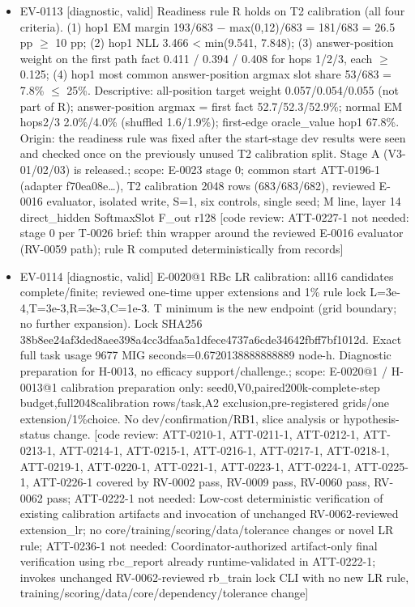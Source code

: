 \documentclass[11pt]{article}
\begin{document}
\begin{itemize}
\item EV-0113 [diagnostic, valid] Readiness rule R holds on T2 calibration (all four criteria). (1) hop1 EM margin 193/683 \ensuremath{-} max(0,12)/683 = 181/683 = 26.5 pp \ensuremath{\geq} 10 pp; (2) hop1 NLL 3.466 \textless{} min(9.541, 7.848); (3) answer-position weight on the first path fact 0.411 / 0.394 / 0.408 for hops 1/2/3, each \ensuremath{\geq} 0.125; (4) hop1 most common answer-position argmax slot share 53/683 = 7.8\% \ensuremath{\leq} 25\%. Descriptive: all-position target weight 0.057/0.054/0.055 (not part of R); answer-position argmax = first fact 52.7/52.3/52.9\%; normal EM hops2/3 2.0\%/4.0\% (shuffled 1.6/1.9\%); first-edge oracle\_value hop1 67.8\%. Origin: the readiness rule was fixed after the start-stage dev results were seen and checked once on the previously unused T2 calibration split. Stage A (V3-01/02/03) is released.; scope: E-0023 stage 0; common start ATT-0196-1 (adapter f70ea08e\ldots{}), T2 calibration 2048 rows (683/683/682), reviewed E-0016 evaluator, isolated write, S=1, six controls, single seed; M line, layer 14 direct\_hidden SoftmaxSlot F\_out r128 [code review: ATT-0227-1 not needed: stage 0 per T-0026 brief: thin wrapper around the reviewed E-0016 evaluator (RV-0059 path); rule R computed deterministically from records]
\item EV-0114 [diagnostic, valid] E-0020@1 RBc LR calibration: all16 candidates complete/finite; reviewed one-time upper extensions and 1\% rule lock L=3e-4,T=3e-3,R=3e-3,C=1e-3. T minimum is the new endpoint (grid boundary; no further expansion). Lock SHA256 38b8ee24af3ded8aee398a4cc3dfaa5a1dfece4737a6cde34642fbff7bf1012d. Exact full task usage 9677 MIG seconds=0.6720138888888889 node-h. Diagnostic preparation for H-0013, no efficacy support/challenge.; scope: E-0020@1 / H-0013@1 calibration preparation only: seed0,V0,paired200k-complete-step budget,full2048calibration rows/task,A2 exclusion,pre-registered grids/one extension/1\%choice. No dev/confirmation/RB1, slice analysis or hypothesis-status change. [code review: ATT-0210-1, ATT-0211-1, ATT-0212-1, ATT-0213-1, ATT-0214-1, ATT-0215-1, ATT-0216-1, ATT-0217-1, ATT-0218-1, ATT-0219-1, ATT-0220-1, ATT-0221-1, ATT-0223-1, ATT-0224-1, ATT-0225-1, ATT-0226-1 covered by RV-0002 pass, RV-0009 pass, RV-0060 pass, RV-0062 pass; ATT-0222-1 not needed: Low-cost deterministic verification of existing calibration artifacts and invocation of unchanged RV-0062-reviewed extension\_lr; no core/training/scoring/data/tolerance changes or novel LR rule; ATT-0236-1 not needed: Coordinator-authorized artifact-only final verification using rbc\_report already runtime-validated in ATT-0222-1; invokes unchanged RV-0062-reviewed rb\_train lock CLI with no new LR rule, training/scoring/data/core/dependency/tolerance change]

\end{itemize}
\end{document}
